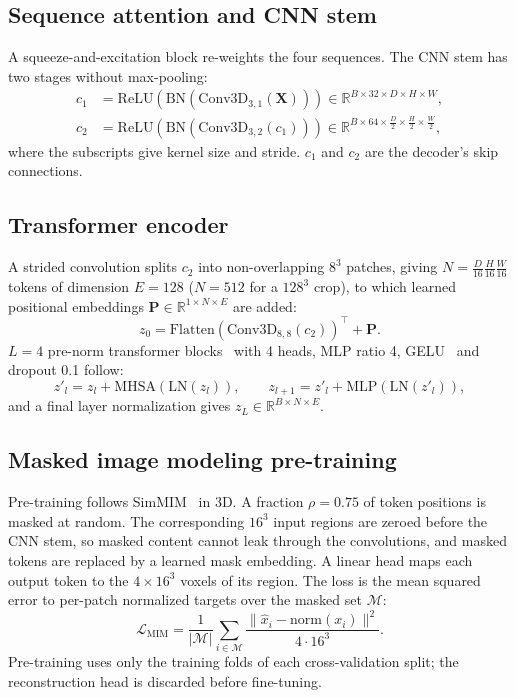 \documentclass[pdflatex,sn-mathphys-num]{sn-jnl}
\begin{document}
\subsection{Sequence attention and CNN stem}
A squeeze-and-excitation block re-weights the four sequences. The CNN stem has two stages without max-pooling:
\begin{align}
c_1 &= \mathrm{ReLU}(\mathrm{BN}(\mathrm{Conv3D}_{3,1}(\mathbf{X})))\in\mathbb{R}^{B\times32\times D\times H\times W},\\
c_2 &= \mathrm{ReLU}(\mathrm{BN}(\mathrm{Conv3D}_{3,2}(c_1)))\in\mathbb{R}^{B\times64\times\frac{D}{2}\times\frac{H}{2}\times\frac{W}{2}},
\end{align}
where the subscripts give kernel size and stride. $c_1$ and $c_2$ are the decoder's skip connections.

\subsection{Transformer encoder}
A strided convolution splits $c_2$ into non-overlapping $8^3$ patches, giving $N=\frac{D}{16}\frac{H}{16}\frac{W}{16}$ tokens of dimension $E=128$ ($N=512$ for a $128^3$ crop), to which learned positional embeddings $\mathbf{P}\in\mathbb{R}^{1\times N\times E}$ are added:
\begin{equation}
z_0=\mathrm{Flatten}(\mathrm{Conv3D}_{8,8}(c_2))^\top+\mathbf{P}.
\end{equation}
$L=4$ pre-norm transformer blocks~\cite{vaswani2017,ba2016layernorm} with 4 heads, MLP ratio 4, GELU~\cite{hendrycks2016gelu} and dropout 0.1 follow:
\begin{equation}
z'_l=z_l+\mathrm{MHSA}(\mathrm{LN}(z_l)),\qquad z_{l+1}=z'_l+\mathrm{MLP}(\mathrm{LN}(z'_l)),
\end{equation}
and a final layer normalization gives $z_L\in\mathbb{R}^{B\times N\times E}$.

\subsection{Masked image modeling pre-training}
Pre-training follows SimMIM~\cite{xie2022simmim} in 3D. A fraction $\rho=0.75$ of token positions is masked at random. The corresponding $16^3$ input regions are zeroed before the CNN stem, so masked content cannot leak through the convolutions, and masked tokens are replaced by a learned mask embedding. A linear head maps each output token to the $4\times16^3$ voxels of its region. The loss is the mean squared error to per-patch normalized targets over the masked set $\mathcal{M}$:
\begin{equation}
\mathcal{L}_{\mathrm{MIM}}=\frac{1}{|\mathcal{M}|}\sum_{i\in\mathcal{M}}\frac{\lVert\hat{x}_i-\mathrm{norm}(x_i)\rVert^2}{4\cdot16^3}.
\end{equation}
Pre-training uses only the training folds of each cross-validation split; the reconstruction head is discarded before fine-tuning.
\end{document}
